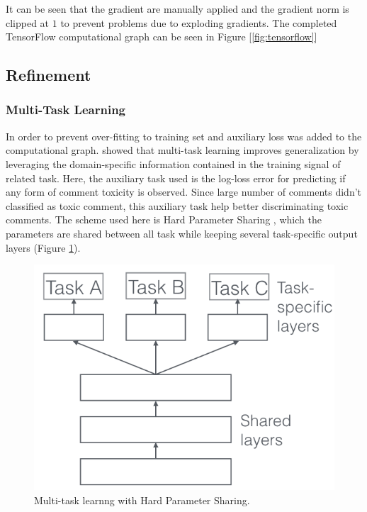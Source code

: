 \documentclass{article}
\begin{document}
    It can be seen that the gradient are manually applied and the gradient norm is clipped at $1$ to prevent problems due to exploding gradients. The completed TensorFlow computational graph can be seen in Figure [\ref{fig:tensorflow}]

    \subsection{Refinement}

    \subsubsection{Multi-Task Learning}
        In order to prevent over-fitting to training set and auxiliary loss was added to the computational graph. \cite{caruana1998multitask} showed that multi-task learning improves generalization by leveraging the domain-specific information contained in the training signal of related task. Here, the auxiliary task used is the log-loss error for predicting if any form of comment toxicity is observed. Since large number of comments didn't classified as toxic comment, this auxiliary task help better discriminating toxic comments. The scheme used here is Hard Parameter Sharing \cite{caruanamultitask}, which the parameters are shared between all task while keeping several task-specific output layers (Figure \ref{fig:mtl}).

        \begin{figure}
            \centering
            \includegraphics[scale=0.4]{mtl.png}
            \caption{Multi-task learnng with Hard Parameter Sharing.}
            \label{fig:mtl}
        \end{figure}
\end{document}
